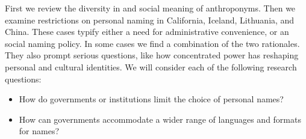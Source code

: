 First we review the diversity in and social meaning of anthroponyms. Then we
examine restrictions on personal naming in California, Iceland, Lithuania, and
China. These cases typify either a need for administrative convenience, or an
social naming policy. In some cases we find a combination of the two rationales.
They also prompt serious questions, like how concentrated power has reshaping
personal and cultural identities. We will consider each of the following
research questions:

\begin{itemize}
\item How do governments or institutions limit the choice of personal names?
\item How can governments accommodate a wider range of languages and formats for
	names?
\end{itemize}
